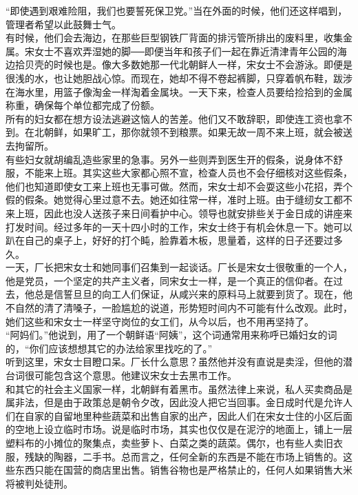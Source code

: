 “即使遇到艰难险阻，我们也要誓死保卫党。”当在外面的时候，他们还这样唱到，管理者希望以此鼓舞士气。\\

有时候，他们会去海边，在那些巨型钢铁厂背面的排污管所排出的废料里，收集金属。宋女士不喜欢弄湿她的脚──即便当年和孩子们一起在靠近清津青年公园的海边拾贝壳的时候也是。像大多数她那一代北朝鲜人一样，宋女士不会游泳。即便是很浅的水，也让她胆战心惊。而现在，她却不得不卷起裤脚，只穿着帆布鞋，跋涉在海水里，用篮子像淘金一样淘着金属块。一天下来，检查人员要给捡拾到的金属称重，确保每个单位都完成了份额。\\

所有的妇女都在想方设法逃避这恼人的苦差。他们又不敢辞职，即使连工资也拿不到。在北朝鲜，如果旷工，那你就领不到粮票。如果无故一周不来上班，就会被送去拘留所。\\

有些妇女就胡编乱造些家里的急事。另外一些则弄到医生开的假条，说身体不舒服，不能来上班。其实这些大家都心照不宣，检查人员也不会仔细核对这些假条，他们也知道即使女工来上班也无事可做。然而，宋女士却不会耍这些小花招，弄个假的假条。她觉得心里过意不去。她还如往常一样，准时上班。由于缝纫女工都不来上班，因此也没人送孩子来日间看护中心。领导也就安排些关于金日成的讲座来打发时间。经过多年的一天十四小时的工作，宋女士终于有机会休息一下。她可以趴在自己的桌子上，好好的打个盹，脸靠着木板，思量着，这样的日子还要过多久。\\

一天，厂长把宋女士和她同事们召集到一起谈话。厂长是宋女士很敬重的一个人，他是党员，一个坚定的共产主义者，同宋女士一样，是一个真正的信仰者。在过去，他总是信誓旦旦的向工人们保证，从咸兴来的原料马上就要到货了。现在，他不自然的清了清嗓子，一脸尴尬的说道，形势短时间内不可能有什么改观。此时，她们这些和宋女士一样坚守岗位的女工们，从今以后，也不用再坚持了。\\

“阿妈们。”他说到，用了一个朝鲜语“阿姨”，这个词通常用来称呼已婚妇女的词的，“你们应该想想其它的办法给家里找吃的了。”\\

听到这里，宋女士目瞪口呆。厂长什么意思？虽然他并没有直说是卖淫，但他的潜台词很可能包含这个意思。他建议宋女士去黑市工作。\\

和其它的社会主义国家一样，北朝鲜有着黑市。虽然法律上来说，私人买卖商品是属非法，但是由于政策总是朝令夕改，因此没人把它当回事。金日成时代是允许人们在自家的自留地里种些蔬菜和出售自家的出产，因此人们在宋女士住的小区后面的空地上设立临时市场。说是临时市场，其实也仅仅是在泥泞的地面上，铺上一层塑料布的小摊位的聚集点，卖些萝卜、白菜之类的蔬菜。偶尔，也有些人卖旧衣服，残缺的陶器，二手书。总而言之，任何全新的东西是不能在市场上销售的。这些东西只能在国营的商店里出售。销售谷物也是严格禁止的，任何人如果销售大米将被判处徒刑。\\

